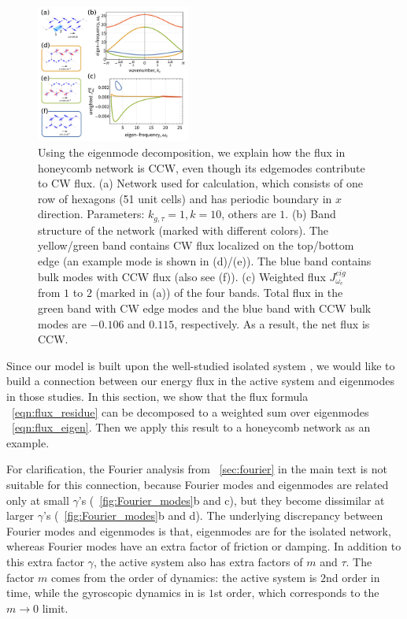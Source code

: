 \documentclass[
 amsmath,amssymb,
 aps,
 pre,
 longbibliography,
 10pt, onecolumn,
 notitlepage
]{revtex4-1}
\begin{document}
\begin{figure}[ht]
	\centering
	\includegraphics[width=0.45\textwidth]{3_eigen_modes.pdf}
    \caption{Using the eigenmode decomposition, we explain how the flux in honeycomb network is CCW, even though its edgemodes contribute to CW flux.
    (a) Network used for calculation, which consists of one row of hexagons (51 unit cells) and has periodic boundary in $x$ direction. Parameters: $k_{g,\tau}=1, k=10$, others are $1$.
    (b) Band structure of the network (marked with different colors). The yellow/green band contains CW flux localized on the top/bottom edge (an example mode is shown in (d)/(e)). The blue band contains bulk modes with CCW flux (also see (f)).
    (c) Weighted flux $J_{\omega_e}^{eig}$ from $1$ to $2$ (marked in (a)) of the four bands. Total flux in the green band with CW edge modes and the blue band with CCW bulk modes are $-0.106$ and $0.115$, respectively. As a result, the net flux is CCW.
    }
    \label{fig:eigen_modes}
\end{figure}

Since our model is built upon the well-studied isolated system \cite{Nash2015TopologicalMechanics,Susstrunk2016ClassificationTopological,Mitchell2018AmorphousTopological,Lee2018TopologicalDynamics}, we would like to build a connection between our energy flux in the active system and eigenmodes in those studies.
In this section, we show that the flux formula \eqnname~\eqref{eqn:flux_residue} can be decomposed to a weighted sum over eigenmodes \eqnname~\eqref{eqn:flux_eigen}. Then we apply this result to a honeycomb network as an example.

For clarification, the Fourier analysis from \secname~\ref{sec:fourier} in the main text is not suitable for this connection, because Fourier modes and eigenmodes are related only at small $\gamma$'s (\figurename~\ref{fig:Fourier_modes}b and c), but they become dissimilar at larger $\gamma$'s (\figurename~\ref{fig:Fourier_modes}b and d).
The underlying discrepancy between Fourier modes and eigenmodes is that, eigenmodes are for the isolated network, whereas Fourier modes have an extra factor of friction or damping.
In addition to this extra factor $\gamma$,
the active system also has extra factors of $m$ and $\tau$. The factor $m$ comes from the order of dynamics: the active system is $2$nd order in time, while the gyroscopic dynamics in \cite{Nash2015TopologicalMechanics} is $1$st order, which corresponds to the $m\rightarrow 0$ limit.
\end{document}

